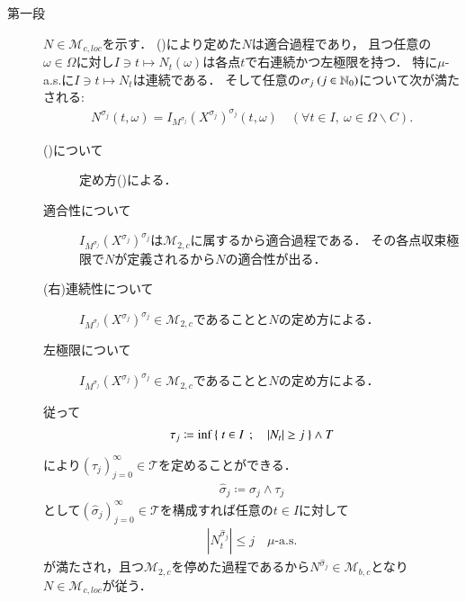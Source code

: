 	\begin{prf} \mbox{}
		\begin{description}
			\item[第一段] $N \in \mathcal{M}_{c,loc}$を示す．
				()により定めた$N$は適合過程であり，
				且つ任意の$\omega \in \Omega$に対し$I \ni t \longmapsto N_t(\omega)$は各点$t$で右連続かつ左極限を持つ．
				特に$\mu$-a.s.に$I \ni t \longmapsto N_t$は連続である．
				そして任意の$\sigma_j\ (j \in \mathbb{N}_0)$について次が満たされる:
				\begin{align}
					N^{\sigma_j}(t,\omega) = I_{M^{\sigma_j}}(X^{\sigma_j})^{\sigma_j}(t,\omega)
					\quad (\forall t \in I,\ \omega \in \Omega \backslash C).
					\label{eq:Ito-Integral_on_M_c_loc_localize}
				\end{align}
				\begin{description}
					\item[()について]
						定め方()による．
					\item[適合性について]
						$I_{M^{\sigma_j}}(X^{\sigma_j})^{\sigma_j}$は$\mathcal{M}_{2,c}$に属するから適合過程である．
						その各点収束極限で$N$が定義されるから$N$の適合性が出る．
					\item[(右)連続性について] $I_{M^{\sigma_j}}(X^{\sigma_j})^{\sigma_j} \in \mathcal{M}_{2,c}$であることと$N$の定め方による．
					\item[左極限について] $I_{M^{\sigma_j}}(X^{\sigma_j})^{\sigma_j} \in \mathcal{M}_{2,c}$であることと$N$の定め方による．
				\end{description}
				従って
				\begin{align}
					\tau_j \coloneqq \operatorname*{inf}_{} \left\{\ t \in I\ \, ; \quad |N_t| \geq j\ \right\} \wedge T
				\end{align}
				により$(\tau_j)_{j=0}^{\infty} \in \mathcal{T}$を定めることができる．
				\begin{align}
					\hat{\sigma}_j \coloneqq \sigma_j \wedge \tau_j
				\end{align}
				として$\left( \hat{\sigma}_j \right)_{j=0}^{\infty} \in \mathcal{T}$を構成すれば任意の$t \in I$に対して
				\begin{align}
					\left| N^{\hat{\sigma}_j}_t \right| \leq j \quad \mbox{$\mu$-a.s.}
				\end{align}
				が満たされ，且つ$\mathcal{M}_{2,c}$を停めた過程であるから$N^{\hat{\sigma}_j} \in \mathcal{M}_{b,c}$となり$N \in \mathcal{M}_{c,loc}$が従う．
			

\end{description}
\end{prf}
